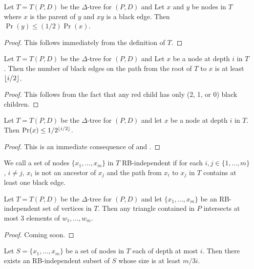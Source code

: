 \documentclass[lotsofwhite]{patmorin}
\begin{document}
\begin{lem}
Let $T=T(P,D)$ be the $\Delta$-tree for $(P,D)$ and
Let $x$ and $y$ be nodes in $T$ where $x$ is the parent of $y$ and
$xy$ is a black edge.  Then $\Pr(y)\le(1/2)\Pr(x)$.
\end{lem}

\begin{proof}
This follows immediately from the definition of $T$.
\end{proof}

\begin{lem}
Let $T=T(P,D)$ be the $\Delta$-tree for $(P,D)$ and
Let $x$ be a node at depth $i$ in $T$.  Then the number of black edges
on the path from the root of $T$ to $x$ is at least $\left\lfloor i/2 \right\rfloor$.
\end{lem}

\begin{proof}
This follows from the fact that any red child has only (2,
1, or 0) black children.
\end{proof}


\begin{lem}
Let $T=T(P,D)$ be the $\Delta$-tree for $(P,D)$ and
let $x$ be a node at depth $i$ in $T$.  Then $\Pr(x)\le 1/2^{\left\lfloor i/2 \right\rfloor}$.
\end{lem}

\begin{proof}
This is an immediate consequence of  and
.
\end{proof}

We call a set of nodes $\{x_1,\ldots,x_m\}$ in $T$ RB-independent if 
for each $i,j\in\{1,\ldots,m\}$, $i\neq j$, $x_i$ is not an ancestor
of $x_j$ and the path from $x_i$ to $x_j$ in $T$ contains at least one
black edge.

\begin{lem}
Let $T=T(P,D)$ be the $\Delta$-tree for $(P,D)$ and
let $\{x_1,\ldots,x_m\}$ be an RB-independent set of vertices in $T$.
Then any triangle contained in $P$ intersects at most 3 elements of
$w_1,\ldots,w_m$.
\end{lem}

\begin{proof}
Coming soon.
\end{proof}

\begin{lem}
Let $S=\{x_1,\ldots,x_m\}$ be a set of nodes in $T$ each of depth at
most $i$.  Then there exists an RB-independent subset of $S$ whose
size is at least $m/3i$.
\end{lem}
\end{document}
